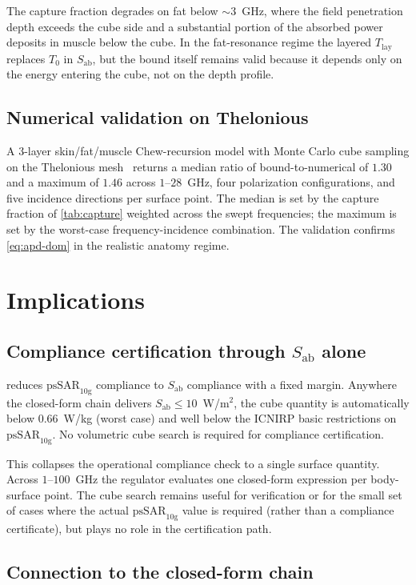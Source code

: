 \documentclass[11pt,a4paper]{article}
\theoremstyle{definition}
\theoremstyle{remark}
\newcommand{\APD}{S_{\mathrm{ab}}}
\newcommand{\Tlay}{T_{\mathrm{lay}}}
\newcommand{\Tzero}{T_0}
\newcommand{\psSAR}{\ensuremath{\mathrm{psSAR}_{10\mathrm{g}}}}
\begin{document}
The capture fraction degrades on fat below $\sim 3$~GHz, where the field
penetration depth exceeds the cube side and a substantial portion of
the absorbed power deposits in muscle below the cube. In the
fat-resonance regime the layered $\Tlay$ replaces $\Tzero$ in
$\APD$, but the bound itself remains valid because it depends only on
the energy entering the cube, not on the depth profile.

\subsection{Numerical validation on Thelonious}

A 3-layer skin/fat/muscle Chew-recursion model with Monte Carlo cube
sampling on the Thelonious mesh~\cite{ThelonioPhantom} returns a median
ratio of bound-to-numerical of $1.30$ and a maximum of $1.46$ across
$1$--$28$~GHz, four polarization configurations, and five incidence
directions per surface point. The median is set by the capture fraction
of \cref{tab:capture} weighted across the swept frequencies; the
maximum is set by the worst-case frequency-incidence combination.
The validation confirms \cref{eq:apd-dom} in the realistic anatomy
regime.

\section{Implications}\label{sec:implications}

\subsection{Compliance certification through $\APD$ alone}

 reduces $\psSAR$ compliance to $\APD$ compliance
with a fixed margin. Anywhere the closed-form chain delivers
$\APD \le 10$~W/m$^2$, the cube quantity is automatically below
$0.66$~W/kg (worst case) and well below the ICNIRP basic restrictions
on $\psSAR$. No volumetric cube search is required for compliance
certification.

This collapses the operational compliance check to a single surface
quantity. Across $1$--$100$~GHz the regulator evaluates one closed-form
expression per body-surface point. The cube search remains useful for
verification or for the small set of cases where the actual
$\psSAR$ value is required (rather than a compliance certificate), but
plays no role in the certification path.

\subsection{Connection to the closed-form chain}
\end{document}
